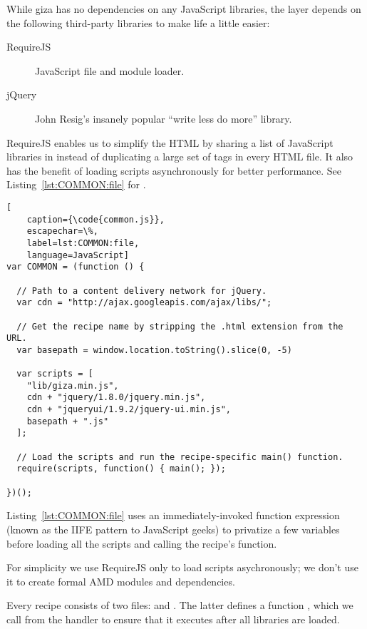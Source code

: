 While giza has no dependencies on any JavaScript libraries, the  layer depends on the following third-party libraries to make life a little easier:

\begin{description}
\item[RequireJS] JavaScript file and module loader.
\item[jQuery] John Resig's insanely popular ``write less do more'' library.
\end{description}

RequireJS enables us to simplify the HTML by sharing a list of JavaScript libraries in  instead of duplicating a large set of  tags in every HTML file.  It also has the benefit of loading scripts asynchronously for better performance.  See Listing~\ref{lst:COMMON:file} for .

\begin{lstlisting}[
    caption={\code{common.js}},
    escapechar=\%,
    label=lst:COMMON:file,
    language=JavaScript]
var COMMON = (function () {

  // Path to a content delivery network for jQuery.
  var cdn = "http://ajax.googleapis.com/ajax/libs/";

  // Get the recipe name by stripping the .html extension from the URL.
  var basepath = window.location.toString().slice(0, -5)

  var scripts = [
    "lib/giza.min.js",
    cdn + "jquery/1.8.0/jquery.min.js",
    cdn + "jqueryui/1.9.2/jquery-ui.min.js",
    basepath + ".js"
  ];

  // Load the scripts and run the recipe-specific main() function.
  require(scripts, function() { main(); });

})();
\end{lstlisting} 

Listing~\ref{lst:COMMON:file} uses an immediately-invoked function expression (known as the IIFE pattern to JavaScript geeks) to privatize a few variables before loading all the scripts and calling the recipe's  function.

\begin{sidenote}
For simplicity we use RequireJS only to load scripts asychronously; we don't use it to create formal AMD modules and dependencies.
\end{sidenote}

Every recipe consists of two files:  and .  The latter defines a function , which we call from the  handler to ensure that it executes after all libraries are loaded.

